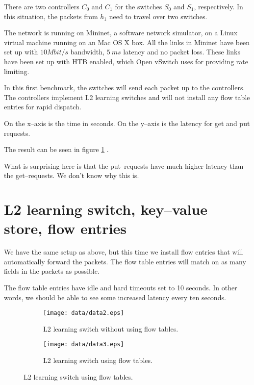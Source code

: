 There are two controllers $C_0$ and $C_1$ for the switches $S_0$ and $S_1$,
respectively.  In this situation, the packets from $h_1$ need to travel
over two switches.

The network is running on Mininet, a software network simulator, on a Linux
virtual machine running on an Mac OS X box.  All the links in Mininet have
been set up with $10 Mbit/s$ bandwidth, $5~ms$ latency and no packet
loss.  These links have been set up with \ac{HTB}
\cite{devera2002hierarchical} enabled, which Open vSwitch
 uses for providing rate limiting.

In this first benchmark, the switches will send each packet up to the
controllers.  The controllers implement L2 learning switches and will not
install any flow table entries for rapid dispatch.

On the x--axis is the time in seconds.  On the y--axis is the latency for
get and put requests.

The result can be seen in figure \ref{benchmark:l2.learning.switch.no.flows} 
.  

What is surprising here is that the put--requests have much higher latency
than the get--requests. We don't know why this is.

\section{L2 learning switch, key--value store, flow entries}

We have the same setup as above, but this time we install flow entries that
will automatically forward the packets.  The flow table entries will match
on as many fields in the packets as possible.

The flow table entries have idle and hard timeouts set to 10 seconds.
In other words, we should be able to see some increased latency every ten
seconds.

\begin{figure}
  \centering
  \begin{subfigure}{\textwidth}
    \centering
    \texttt{[image: data/data2.eps]}
    \caption{L2 learning switch without using flow tables.}
    \label{benchmark:l2.learning.switch.no.flows}
  \end{subfigure}

  \centering
  \begin{subfigure}{\textwidth}
    \centering
    \texttt{[image: data/data3.eps]}
    \caption{L2 learning switch using flow tables.}
    \label{benchmark:l2.learning.switch.with.flows}
  \end{subfigure}
\end{figure}

